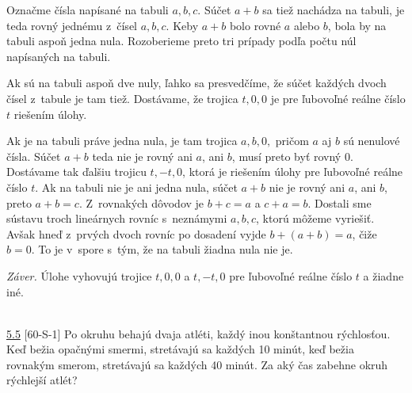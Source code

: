 \rieh Označme čísla napísané na tabuli $a, b, c$. Súčet $a + b$ sa tiež nachádza na tabuli, je teda rovný jednému z~čísel $a, b, c$. Keby $a + b$ bolo rovné $a$ alebo $b$, bola by na tabuli aspoň jedna nula. Rozoberieme preto tri prípady podľa počtu núl napísaných na tabuli.

Ak sú na tabuli aspoň dve nuly, ľahko sa presvedčíme, že súčet každých dvoch čísel z~tabule je tam tiež. Dostávame, že trojica $t, 0, 0$ je pre ľubovoľné reálne číslo $t$ riešením úlohy.

Ak je na tabuli práve jedna nula, je tam trojica $a, b, 0,$ pričom $a$ aj $b$ sú nenulové čísla. Súčet $a + b$ teda nie je rovný ani $a$, ani $b$, musí preto byť rovný 0. Dostávame tak ďalšiu trojicu $t, -t, 0$, ktorá je riešením úlohy pre ľubovoľné reálne číslo $t$.
Ak na tabuli nie je ani jedna nula, súčet $a + b$ nie je rovný ani $a$, ani $b$, preto $a + b = c$. Z~rovnakých dôvodov je $b + c = a$ a $c + a = b$. Dostali sme sústavu troch lineárnych rovníc s~neznámymi $a, b, c$, ktorú môžeme vyriešiť. Avšak hneď z~prvých dvoch rovníc po dosadení vyjde $b + (a + b) = a$, čiže $b = 0$. To je v~spore s~tým, že na tabuli žiadna nula nie je.

\textit{Záver.} Úlohe vyhovujú trojice $t, 0, 0$ a $t, -t, 0$ pre ľubovoľné reálne číslo $t$ a žiadne iné.\\
\\
\begin{tcolorbox}[breakable,notitle,boxrule=0pt,colback=light-gray,colframe=light-gray]\ul{5.5} [60-S-1]
Po okruhu behajú dvaja atléti, každý inou konštantnou rýchlosťou. Keď bežia opačnými smermi, stretávajú sa každých 10 minút, keď bežia rovnakým smerom, stretávajú sa každých 40 minút. Za aký čas zabehne okruh rýchlejší atlét?

\end{tcolorbox}

